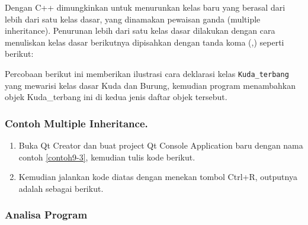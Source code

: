 Dengan C++ dimungkinkan untuk menurunkan kelas baru yang berasal dari
lebih dari satu kelas dasar, yang dinamakan pewaisan ganda (multiple
inheritance). Penurunan lebih dari satu kelas dasar dilakukan dengan
cara menuliskan kelas dasar berikutnya dipisahkan dengan tanda koma (,)
seperti berikut:



Percobaan berikut ini memberikan ilustrasi cara deklarasi kelas
\texttt{Kuda\_terbang} yang mewarisi kelas dasar Kuda dan Burung,
kemudian program menambahkan objek Kuda\_terbang ini di kedua jenis
daftar objek tersebut.

\subsubsection*{Contoh Multiple Inheritance.}

\begin{enumerate}

\item
 Buka Qt Creator dan buat project Qt Console Application baru dengan
 nama contoh \ref{contoh9-3}, kemudian tulis kode berikut.




\item
 Kemudian jalankan kode diatas dengan menekan tombol Ctrl+R, outputnya
 adalah sebagai berikut.
\end{enumerate}

\begin{figure}[htbp]
\centering
{}

\end{figure}

\subsubsection*{Analisa Program}

